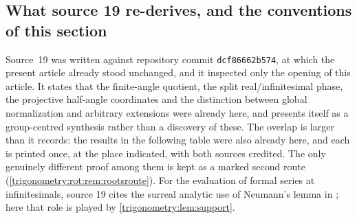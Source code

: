 \documentclass[11pt,letterpaper]{article}
\numberwithin{equation}{section}
\theoremstyle{definition}
\theoremstyle{remark}
\begin{document}
\subsection{What source 19 re-derives, and the conventions of this section}
\label{trigonometry:rot:sec:overlap}
Source~19 was written against repository commit \texttt{dcf86662b574}, at which the present
article already stood unchanged, and it inspected only the opening of this article. It states
that the finite-angle quotient, the split real/infinitesimal phase, the projective half-angle
coordinates and the distinction between global normalization and arbitrary extensions were already
here, and presents itself as a group-centred synthesis rather than a discovery of these. The overlap
is larger than it records: the results in the following table were also already here, and each is
printed once, at the place indicated, with both sources credited. The only genuinely different proof
among them is kept as a marked second route (\cref{trigonometry:rot:rem:rootsroute}). For the
evaluation of formal series at infinitesimals, source 19 cites the surreal analytic use of Neumann's
lemma in \cite[\S3]{BMgerms}; here that role is played by \cref{trigonometry:lem:support}.
\end{document}
